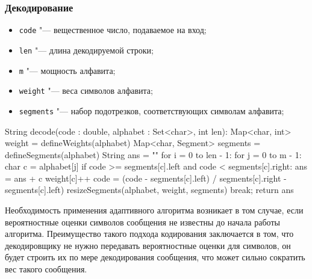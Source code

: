 \documentclass[12pt]{article}
\begin{document}
\subsubsection*{Декодирование}
\begin{itemize}
	\item \verb'code' "--- вещественное число, подаваемое на вход;
	\item \verb'len' "--- длина декодируемой строки;
	\item \verb'm' "--- мощность алфавита;
   \item \verb'weight' "--- веса символов алфавита;
	\item \verb'segments' "--- набор подотрезков, соответствующих символам алфавита;
\end{itemize}
\newpage
\begin{listing}{1}
String decode(code : double, alphabet : Set<char>, int len):
    Map<char, int> weight = defineWeights(alphabet)
    Map<char, Segment> segments = defineSegments(alphabet)
    String ans = ""
    for i = 0 to len - 1:
        for j = 0 to m - 1:
            char c  = alphabet[j]
            if code >= segments[c].left and code < segments[c].right:
                ans = ans + c
                weight[c]++
                code = (code - segments[c].left) / 
segments[c].right - segments[c].left)
                resizeSegments(alphabet, weight, segments)
                break;
    return ans
\end{listing}

Необходимость применения адаптивного алгоритма возникает в том случае, если вероятностные оценки символов сообщения не известны до начала работы алгоритма. Преимущество такого подхода кодирования заключается в том, что декодировщику не нужно передавать вероятностные оценки для символов, он будет строить их по мере декодирования сообщения, что может сильно сократить вес такого сообщения. 
\end{document}
